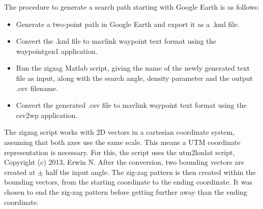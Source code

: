 The procedure to generate a search path starting with Google Earth is as follows:
\begin{itemize}
\item Generate a two-point path in Google Earth and export it as a .kml file.
\item Convert the .kml file to mavlink waypoint text format using the waypointgen1 application.
\item Run the zigzag Matlab script, giving the name of the newly generated text file as input, along
with the search angle, density parameter and the output .csv filename.
\item Convert the generated .csv file to mavlink waypoint text format using the csv2wp application.
\end{itemize}

The zigzag script works with 2D vectors in a cartesian coordinate system, assuming that both axes use the same scale. This means a UTM coordinate representation is necessary. For this, the script uses the utm2lonlat script, Copyright (c) 2013, Erwin N.
After the conversion, two bounding vectors are created at \(\pm\) half the input angle.
The zig-zag pattern is then created within the bounding vectors, from the starting coordinate to the ending coordinate. It was chosen to end the zig-zag pattern before getting further away than the ending coordinate.


